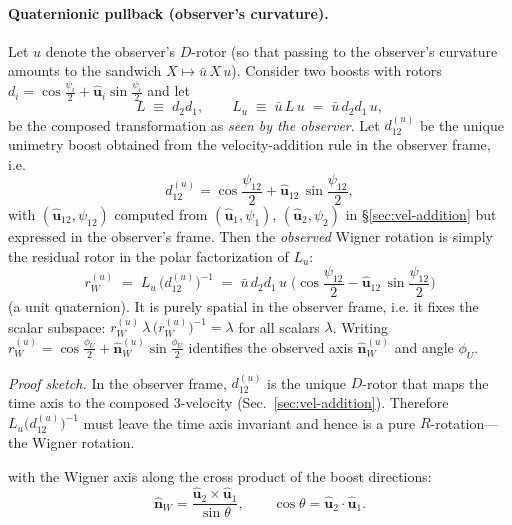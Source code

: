 \documentclass[11pt]{article}
\numberwithin{equation}{section}
\begin{document}
\paragraph{Quaternionic pullback (observer's curvature).}
Let $u$ denote the observer's $D$-rotor (so that passing to the observer's curvature
amounts to the sandwich $X\mapsto \bar u\,X\,u$). Consider two boosts with rotors
$d_i=\cos\frac{\psi_i}{2}+\hat{\mathbf u}_i\sin\frac{\psi_i}{2}$ and let
\begin{equation}
L \;\equiv\; d_2 d_1, \qquad
L_u \;\equiv\; \bar u\, L\, u \;=\; \bar u\, d_2 d_1\, u,
\label{eq:Lu-def}
\end{equation}
be the composed transformation as \emph{seen by the observer}. Let $d^{(u)}_{12}$ be
the unique unimetry boost obtained from the velocity-addition rule in the observer
frame, i.e.
\begin{equation}
d^{(u)}_{12}=\cos\frac{\psi_{12}}{2}+\hat{\mathbf u}_{12}\,\sin\frac{\psi_{12}}{2},
\label{eq:du12-def}
\end{equation}
with $(\hat{\mathbf u}_{12},\psi_{12})$ computed from $(\hat{\mathbf u}_1,\psi_1)$,
$(\hat{\mathbf u}_2,\psi_2)$ in \S\ref{sec:vel-addition} but expressed in the
observer's frame. Then the \emph{observed} Wigner rotation is simply the residual
rotor in the polar factorization of $L_u$:
\begin{equation}
\boxed{\;
r_W^{(u)} \;=\; L_u \,\bigl(d^{(u)}_{12}\bigr)^{-1} \;=\;
\bar u\, d_2 d_1\, u \;\bigl(\cos\frac{\psi_{12}}{2}-\hat{\mathbf u}_{12}\,\sin\frac{\psi_{12}}{2}\bigr)
\;}
\label{eq:wigner-pullback}
\end{equation}
(a unit quaternion). It is purely spatial in the observer frame, i.e. it fixes the
scalar subspace: $r_W^{(u)}\,\lambda\,\bigl(r_W^{(u)}\bigr)^{-1}=\lambda$ for all
scalars $\lambda$. Writing
$r_W^{(u)}=\cos\frac{\phi_U}{2}+\hat{\mathbf n}_W^{(u)}\sin\frac{\phi_U}{2}$
identifies the observed axis $\hat{\mathbf n}_W^{(u)}$ and angle $\phi_U$.

\emph{Proof sketch.} In the observer frame, $d^{(u)}_{12}$ is the unique $D$-rotor
that maps the time axis to the composed 3-velocity (Sec.~\ref{sec:vel-addition}).
Therefore $L_u\bigl(d^{(u)}_{12}\bigr)^{-1}$ must leave the time axis invariant and
hence is a pure $R$-rotation---the Wigner rotation.

with the Wigner axis along the cross product of the boost directions:
\begin{equation}
\hat{\mathbf n}_W=\frac{\hat{\mathbf u}_2\times \hat{\mathbf u}_1}{\sin\theta},
\qquad
\cos\theta=\hat{\mathbf u}_2\!\cdot\!\hat{\mathbf u}_1.
\label{eq:wigner-axis}
\end{equation}
\end{document}
